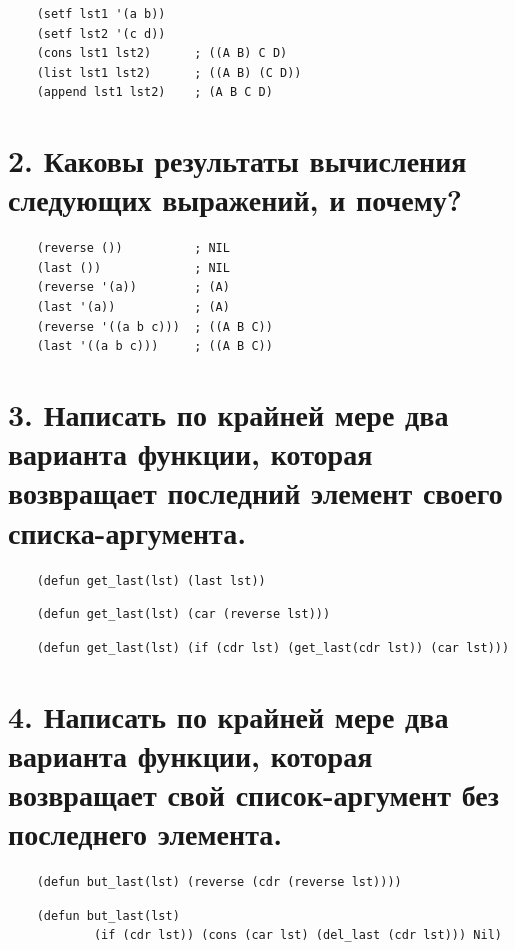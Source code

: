 \documentclass[12pt]{report}
\begin{document}
\begin{lstlisting}
	(setf lst1 '(a b))
	(setf lst2 '(c d))
	(cons lst1 lst2)      ; ((A B) C D)
	(list lst1 lst2)      ; ((A B) (C D))
	(append lst1 lst2)    ; (A B C D)
\end{lstlisting}

\section*{2. Каковы результаты вычисления следующих выражений, и почему?}

\begin{lstlisting}
	(reverse ())          ; NIL
	(last ())             ; NIL
	(reverse '(a))        ; (A)
	(last '(a))           ; (A)
	(reverse '((a b c)))  ; ((A B C))
	(last '((a b c)))     ; ((A B C))
\end{lstlisting}

\section*{3. Написать по крайней мере два варианта функции, которая возвращает последний элемент своего списка-аргумента.}

\begin{lstlisting}
	(defun get_last(lst) (last lst))
\end{lstlisting}

\begin{lstlisting}
	(defun get_last(lst) (car (reverse lst)))
\end{lstlisting}

\begin{lstlisting}
	(defun get_last(lst) (if (cdr lst) (get_last(cdr lst)) (car lst)))
\end{lstlisting}

\section*{4. Написать по крайней мере два варианта функции, которая возвращает свой список-аргумент без последнего элемента.}

\begin{lstlisting}
	(defun but_last(lst) (reverse (cdr (reverse lst))))
\end{lstlisting}

\begin{lstlisting}
	(defun but_last(lst) 
			(if (cdr lst)) (cons (car lst) (del_last (cdr lst))) Nil)
\end{lstlisting}
\end{document}
